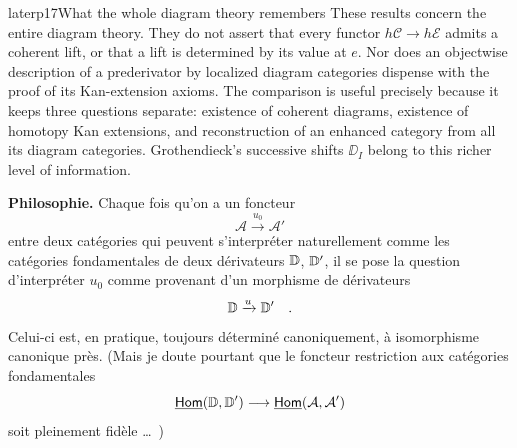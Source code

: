 \begin{dcomment}{later}{p17}{What the whole diagram theory remembers}
These results concern the entire diagram theory. They do not assert that every functor $h\mathcal C\to h\mathcal E$ admits a coherent lift, or that a lift is determined by its value at $e$. Nor does an objectwise description of a prederivator by localized diagram categories dispense with the proof of its Kan-extension axioms. The comparison is useful precisely because it keeps three questions separate: existence of coherent diagrams, existence of homotopy Kan extensions, and reconstruction of an enhanced category from all its diagram categories. Grothendieck's successive shifts $\DD_I$ belong to this richer level of information.
\end{dcomment}


\textbf{Philosophie.} Chaque fois qu'on a un foncteur
\[
\mathcal{A} \xrightarrow{u_0} \mathcal{A}'
\]
entre deux catégories qui peuvent s'interpréter naturellement comme les catégories fondamentales de deux dérivateurs $\mathbb{D}$, $\mathbb{D}'$, il se pose la question d'interpréter $u_0$ comme provenant d'un morphisme de dérivateurs
\[
\mathbb{D} \xrightarrow{u} \mathbb{D}' \quad .
\]
Celui-ci est, en pratique, toujours déterminé canoniquement, à isomorphisme canonique près. (Mais je doute pourtant que le foncteur restriction aux catégories fondamentales
\[
\underline{\mathsf{Hom}}(\mathbb{D},\mathbb{D}') \longrightarrow \underline{\mathsf{Hom}}(\mathcal{A},\mathcal{A}')
\]
soit pleinement fidèle \dots\ )

